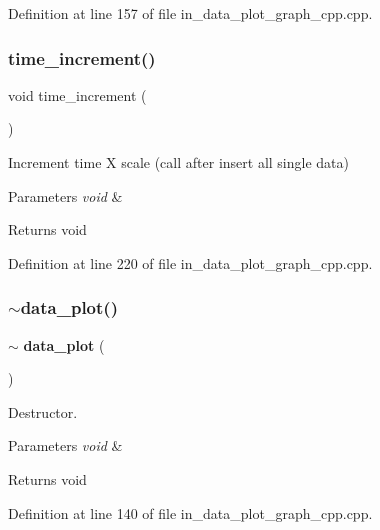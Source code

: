 Definition at line 157 of file in\+\_\+data\+\_\+plot\+\_\+graph\+\_\+cpp.\+cpp.

\mbox{\label{group___data__plot_gae1e547a75737db464df122ed3dc528a9}} 
\subsubsection{time\_increment()}
{\footnotesize\ttfamily void time\+\_\+increment (\begin{DoxyParamCaption}\item[{void}]{ }\end{DoxyParamCaption})}



Increment time X scale (call after insert all single data) 


\begin{DoxyParams}{Parameters}
{\em void} & \\
\hline
\end{DoxyParams}
\begin{DoxyReturn}{Returns}
void 
\end{DoxyReturn}


Definition at line 220 of file in\+\_\+data\+\_\+plot\+\_\+graph\+\_\+cpp.\+cpp.

\mbox{\label{group___data__plot_gafd321bd40ed347458e213f5c9201ce46}} 
\subsubsection{$\sim$data\_plot()}
{\footnotesize\ttfamily $\sim$\textbf{ data\+\_\+plot} (\begin{DoxyParamCaption}\item[{void}]{ }\end{DoxyParamCaption})}



Destructor. 


\begin{DoxyParams}{Parameters}
{\em void} & \\
\hline
\end{DoxyParams}
\begin{DoxyReturn}{Returns}
void 
\end{DoxyReturn}


Definition at line 140 of file in\+\_\+data\+\_\+plot\+\_\+graph\+\_\+cpp.\+cpp.



